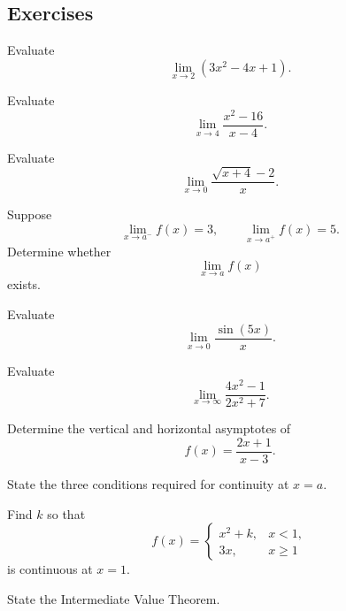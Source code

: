 \subsection{Exercises}
\label{subsec:single-variable-calculus-exercises}

\begin{exercise}[1]
Evaluate
\[ \lim_{x\to2}(3x^2-4x+1). \]
\end{exercise}

\begin{exercise}[2]
Evaluate
\[ \lim_{x\to4}\frac{x^2-16}{x-4}. \]
\end{exercise}

\begin{exercise}[2]
Evaluate
\[ \lim_{x\to0}\frac{\sqrt{x+4}-2}{x}. \]
\end{exercise}

\begin{exercise}[1]
Suppose
\[ \lim_{x\to a^-}f(x)=3,\qquad
\lim_{x\to a^+}f(x)=5. \]
Determine whether
\[ \lim_{x\to a}f(x) \]
exists.
\end{exercise}

\begin{exercise}[2]
Evaluate
\[ \lim_{x\to0}\frac{\sin(5x)}{x}. \]
\end{exercise}

\begin{exercise}[2]
Evaluate
\[ \lim_{x\to\infty}\frac{4x^2-1}{2x^2+7}. \]
\end{exercise}

\begin{exercise}[2]
Determine the vertical and horizontal asymptotes of
\[ f(x)=\frac{2x+1}{x-3}. \]
\end{exercise}

\begin{exercise}[1]
State the three conditions required for continuity at \(x=a\).
\end{exercise}

\begin{exercise}[2]
Find \(k\) so that
\[
f(x)=
\begin{cases}
x^2+k, & x<1,\\
3x, & x\geq1
\end{cases}
\]
is continuous at \(x=1\).
\end{exercise}

\begin{exercise}[1]
State the Intermediate Value Theorem.
\end{exercise}

